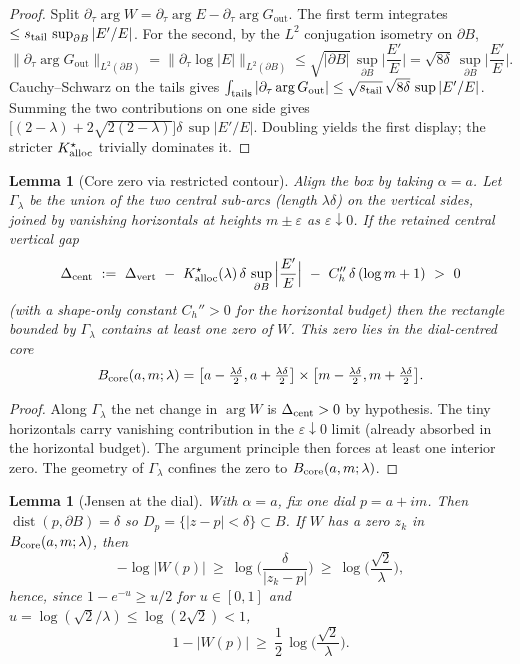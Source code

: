 \documentclass[11pt]{article}
\numberwithin{equation}{section}
\newtheorem{lemma}[theorem]{Lemma}
\theoremstyle{remark}
\newcommand{\Gout}{G_{\mathrm{out}}}
\begin{document}
\begin{proof}
Split $\partial_\tau\arg W=\partial_\tau\arg E-\partial_\tau\arg \Gout$. The first term integrates $\le s_{\rm tail}\,\sup_{\partial B}|E'/E|$. For the second, by the $L^2$ conjugation isometry on $\partial B$,
\[
\|\partial_\tau\arg \Gout\|_{L^2(\partial B)}=\|\partial_\tau\log|E|\|_{L^2(\partial B)}\le \sqrt{|\partial B|}\,\sup_{\partial B}\Big|\frac{E'}{E}\Big|=\sqrt{8\delta}\ \sup_{\partial B}\Big|\frac{E'}{E}\Big|.
\]
Cauchy–Schwarz on the tails gives $\int_{\text{tails}}|\partial_\tau\arg \Gout|\le \sqrt{s_{\rm tail}}\,\sqrt{8\delta}\,\sup|E'/E|$. Summing the two contributions on one side gives $\big[(2-\lambda)+2\sqrt{2(2-\lambda)}\big]\delta\,\sup|E'/E|$. Doubling yields the first display; the stricter $K_{\rm alloc}^{\star}$ trivially dominates it.
\end{proof}

\begin{lemma}[Core zero via restricted contour]\label{lem:corezero}
Align the box by taking $\alpha=a$. Let $\Gamma_\lambda$ be the union of the two central sub-arcs (length $\lambda\delta$) on the vertical sides, joined by vanishing horizontals at heights $m\pm\varepsilon$ as $\varepsilon\downarrow 0$. If the retained central vertical gap
\[
\Delta_{\rm cent}\ :=\ \Delta_{\rm vert}\ -\ K_{\rm alloc}^{\star}(\lambda)\,\delta\,\sup_{\partial B}\Big|\frac{E'}{E}\Big| \ -\ C_h''\,\delta\,(\log m+1)
\ >\ 0
\]
(with a shape-only constant $C_h''>0$ for the horizontal budget) then the rectangle bounded by $\Gamma_\lambda$ contains at least one zero of $W$. This zero lies in the dial-centred core
\[
B_{\rm core}(a,m;\lambda)=\big[a-\tfrac{\lambda\delta}{2},a+\tfrac{\lambda\delta}{2}\big]\times \big[m-\tfrac{\lambda\delta}{2},m+\tfrac{\lambda\delta}{2}\big].
\]
\end{lemma}

\begin{proof}
Along $\Gamma_\lambda$ the net change in $\arg W$ is $\Delta_{\rm cent}>0$ by hypothesis. The tiny horizontals carry vanishing contribution in the $\varepsilon\downarrow0$ limit (already absorbed in the horizontal budget). The argument principle then forces at least one interior zero. The geometry of $\Gamma_\lambda$ confines the zero to $B_{\rm core}(a,m;\lambda)$.
\end{proof}

\begin{lemma}[Jensen at the dial]\label{lem:jensen-dial}
With $\alpha=a$, fix one dial $p=a+im$. Then $\operatorname{dist}(p,\partial B)=\delta$ so $D_p=\{|z-p|<\delta\}\subset B$. If $W$ has a zero $z_k$ in $B_{\rm core}(a,m;\lambda)$, then
\[
-\log|W(p)|\ \ge\ \log\!\Big(\frac{\delta}{|z_k-p|}\Big)\ \ge\ \log\!\Big(\frac{\sqrt{2}}{\lambda}\Big),
\]
hence, since $1-e^{-u}\ge u/2$ for $u\in[0,1]$ and $u=\log(\sqrt{2}/\lambda)\le \log(2\sqrt{2})<1$,
\[
1-|W(p)|\ \ge\ \frac{1}{2}\,\log\!\Big(\frac{\sqrt{2}}{\lambda}\Big).
\]
\end{lemma}
\end{document}
